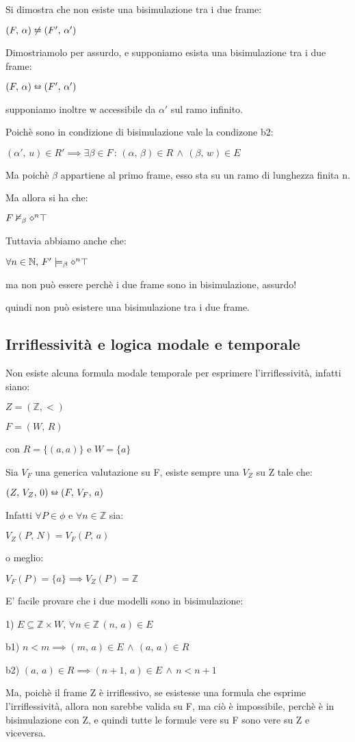 Si dimostra che non esiste una bisimulazione tra i due frame:

$(F,\,\alpha)\not\leftrightarroweq(F',\,\alpha')$

Dimostriamolo per assurdo, e supponiamo esista una bisimulazione tra
i due frame: 

$(F,\,\alpha)\leftrightarroweq(F',\,\alpha')$

supponiamo inoltre w accessibile da $\alpha'$ sul ramo infinito.

Poichè sono in condizione di bisimulazione vale la condizone b2:

$(\alpha',\, u)\in R'\implies\exists\beta\in F\,:\,(\alpha,\,\beta)\in R\,\wedge\,(\beta,\, w)\in E$

Ma poichè $\beta$ appartiene al primo frame, esso sta su un ramo
di lunghezza finita n.

Ma allora si ha che:

$F\nvDash_{\beta}\diamond^{n}\top$

Tuttavia abbiamo anche che:

$\forall n\in\mathbb{N},\, F'\models_{\beta}\diamond^{n}\top$

ma non può essere perchè i due frame sono in bisimulazione, assurdo!

quindi non può esistere una bisimulazione tra i due frame.


\subsection{Irriflessività e logica modale e temporale}

Non esiste alcuna formula modale temporale per esprimere l'irriflessività,
infatti siano:

$Z=(\mathbb{Z},<)$

$F=(W,\, R)$

con $R=\{(a,a)\}$ e $W=\{a\}$

Sia $V_{F}$ una generica valutazione su F, esiste sempre una $V_{Z}$
su Z tale che:

$(Z,\, V_{Z},\,0)\leftrightarroweq(F,\, V_{F},\, a)$

Infatti $\forall P\in\phi$ e $\forall n\in\mathbb{Z}$ sia:

$V_{Z}(P,\, N)=V_{F}(P,\, a)$ 

o meglio:

$V_{F}(P)=\{a\}\implies V_{Z}(P)=\mathbb{Z}$

E' facile provare che i due modelli sono in bisimulazione:

1) $E\subseteq\mathbb{Z}\times W,\,\forall n\in\mathbb{Z}\,(n,\, a)\in E$

b1) $n<m\implies(m,\, a)\in E\,\wedge\,(a,\, a)\in R$

b2) $(a,\, a)\in R\implies(n+1,\, a)\in E\,\wedge\, n<n+1$

Ma, poichè il frame Z è irriflessivo, se esistesse una formula che
esprime l'irriflessività, allora non sarebbe valida su F, ma ciò è
impossibile, perchè è in bisimulazione con Z, e quindi tutte le formule
vere su F sono vere su Z e viceversa.
